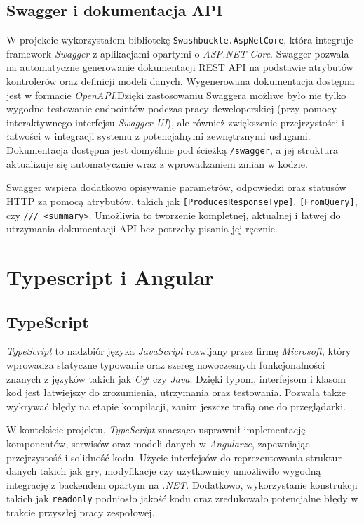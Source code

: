 \documentclass[a4paper,twoside,12pt]{book}
\begin{document}
\subsection{Swagger i dokumentacja API}
W projekcie wykorzystałem bibliotekę \texttt{Swashbuckle.AspNetCore}, która integruje framework \textit{Swagger} z aplikacjami opartymi o \textit{ASP.NET Core}. Swagger pozwala na automatyczne generowanie dokumentacji REST API na podstawie atrybutów kontrolerów oraz definicji modeli danych. Wygenerowana dokumentacja dostępna jest w formacie \textit{OpenAPI}\cite{swaggerdocs2025}.Dzięki zastosowaniu Swaggera możliwe było nie tylko wygodne testowanie endpointów podczas pracy deweloperskiej (przy pomocy interaktywnego interfejsu \textit{Swagger UI}), ale również zwiększenie przejrzystości i łatwości w integracji systemu z potencjalnymi zewnętrznymi usługami. Dokumentacja dostępna jest domyślnie pod ścieżką \texttt{/swagger}, a jej struktura aktualizuje się automatycznie wraz z wprowadzaniem zmian w kodzie.

Swagger wspiera dodatkowo opisywanie parametrów, odpowiedzi oraz statusów HTTP za pomocą atrybutów, takich jak \texttt{[ProducesResponseType]}, \texttt{[FromQuery]}, czy \texttt{/// <summary>}. Umożliwia to tworzenie kompletnej, aktualnej i łatwej do utrzymania dokumentacji API bez potrzeby pisania jej ręcznie.

\section{Typescript i Angular}

\subsection{TypeScript}

\textit{TypeScript} to nadzbiór języka \textit{JavaScript} rozwijany przez firmę \textit{Microsoft}, który wprowadza statyczne typowanie oraz szereg nowoczesnych funkcjonalności znanych z języków takich jak \textit{C\#} czy \textit{Java}. Dzięki typom, interfejsom i klasom kod jest łatwiejszy do zrozumienia, utrzymania oraz testowania. Pozwala także wykrywać błędy na etapie kompilacji, zanim jeszcze trafią one do przeglądarki.

W kontekście projektu, \textit{TypeScript} znacząco usprawnił implementację komponentów, serwisów oraz modeli danych w \textit{Angularze}, zapewniając przejrzystość i solidność kodu. Użycie interfejsów do reprezentowania struktur danych takich jak gry, modyfikacje czy użytkownicy umożliwiło wygodną integrację z backendem opartym na \textit{.NET}. Dodatkowo, wykorzystanie konstrukcji takich jak \texttt{readonly} podniosło jakość kodu oraz zredukowało potencjalne błędy w trakcie przyszłej pracy zespołowej\cite{typescript2025}.
\end{document}
